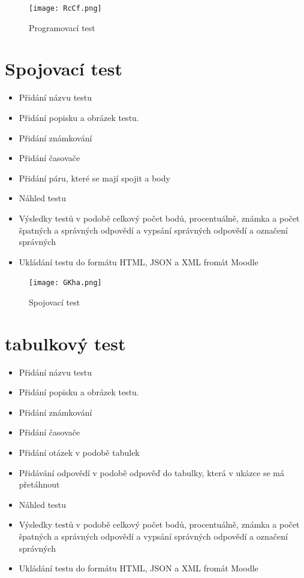 \documentclass[12pt, a4paper, twoside, openright]{report}
\begin{document}
    \begin{figure}[h]
		\centering
		\texttt{[image: RcCf.png]}
		\caption{Programovací test}
		\label{fig:architecture}
	\end{figure}

    \section{Spojovací test}
	\begin{itemize}
		\item Přidání názvu testu
		\item Přidání popisku a obrázek testu.
		\item Přidání známkování
		\item Přidání časovače
            \item Přidání páru, které se mají spojit a body
            \item Náhled testu
            \item Výsledky testů v podobě celkový počet bodů, procentuálně, známka a počet špatných a správných odpovědí a vypsání správných odpovědí a označení správných
            \item Ukládání testu do formátu HTML, JSON a XML fromát Moodle
	\end{itemize}

    \begin{figure}[h]
		\centering
		\texttt{[image: GKha.png]}
		\caption{Spojovací test}
		\label{fig:architecture}
	\end{figure}

    \section{tabulkový test}
	\begin{itemize}
		\item Přidání názvu testu
		\item Přidání popisku a obrázek testu.
		\item Přidání známkování
		\item Přidání časovače
            \item Přidání otázek v podobě tabulek
            \item Přidávání odpovědí v podobě odpověď do tabulky, která v ukázce se má přetáhnout
            \item Náhled testu
            \item Výsledky testů v podobě celkový počet bodů, procentuálně, známka a počet špatných a správných odpovědí a vypsání správných odpovědí a označení správných
            \item Ukládání testu do formátu HTML, JSON a XML fromát Moodle
	\end{itemize}
\end{document}
